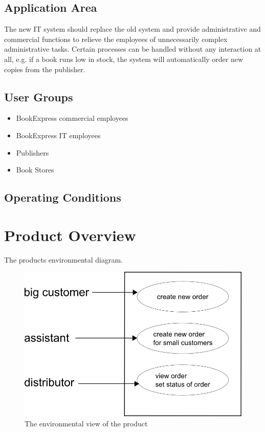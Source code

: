 \documentclass[11pt,a4paper,oneside,svgnames]{report}
\begin{document}
\section{Application Area}
The new IT system should replace the old system and provide administrative and commercial functions to relieve the employees of unnecessarily complex administrative tasks. Certain processes can be handled without any interaction at all, e.g. if a book runs low in stock, the system will automatically order new copies from the publisher.
\section{User Groups}
\begin{itemize}
\item BookExpress commercial employees
\item BookExpress IT employees
\item Publishers
\item Book Stores
\end{itemize}
\section{Operating Conditions}

\chapter{Product Overview}
The products environmental diagram.

\begin{figure}[h!]
 \begin{center}
  \includegraphics[scale=0.8]{images/umweltdiagramm.png}
 \end{center}
 \caption{The environmental view of the product}
\end{figure}
\end{document}
